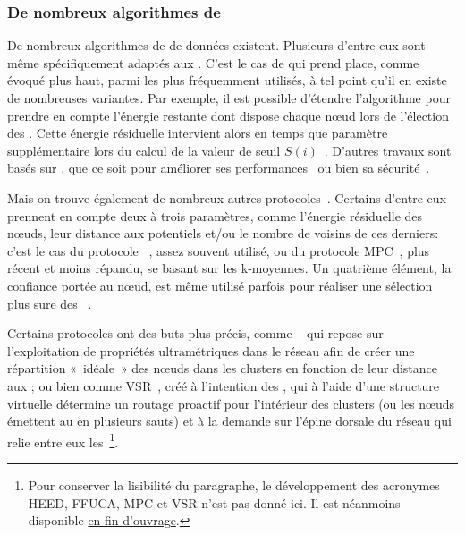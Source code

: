         \subsubsection{De nombreux algorithmes de }
De nombreux algorithmes de  de données existent.
Plusieurs d'entre eux sont même spécifiquement adaptés aux \rcsfs.
C'est le cas de \leach qui prend place, comme évoqué plus haut, parmi les plus fréquemment utilisés, à tel point qu'il en existe de nombreuses variantes.
Par exemple, il est possible d'étendre l'algorithme pour prendre en compte l'énergie restante dont dispose chaque nœud lors de l'élection des \CH.
Cette énergie résiduelle intervient alors en temps que paramètre supplémentaire lors du calcul de la valeur de seuil $S(i)$~\cite{HHT02}.
D'autres travaux sont basés sur \leach, que ce soit pour améliorer ses performances~\cite{RR13,CJ14} ou bien sa sécurité~\cite{OFVWBDL07}.

Mais on trouve également de nombreux autres protocoles~\cite{AY07,DQWH13}.
Certains d'entre eux prennent en compte deux à trois paramètres, comme l'énergie résiduelle des nœuds, leur distance aux \chs potentiels et/ou le nombre de voisins de ces derniers: c'est le cas du protocole \heed~\cite{YF04}, assez souvent utilisé, ou du protocole MPC~\cite{KTAA12}, plus récent et moins répandu, se basant sur les k-moyennes.
Un quatrième élément, la confiance portée au nœud, est même utilisé parfois pour réaliser une sélection plus sure des \CH~\cite{KMSL09}.

Certains protocoles ont des buts plus précis, comme \ffuca~\cite{FL11,FMMMI12} qui repose sur l'exploitation de propriétés ultramétriques dans le réseau afin de créer une répartition « idéale » des nœuds dans les clusters en fonction de leur distance aux \CH; ou bien comme VSR~\cite{TV08}, créé à l'intention des , qui à l'aide d'une structure virtuelle détermine un routage proactif pour l'intérieur des clusters (ou les nœuds émettent au \ch en plusieurs sauts) et à la demande sur l'épine dorsale du réseau qui relie entre eux les \CH\,\footnote{Pour conserver la lisibilité du paragraphe, le développement des acronymes HEED, FFUCA, MPC et VSR n'est pas donné ici. Il est néanmoins disponible \hyperref[acronymes]{en fin d'ouvrage}.}.

